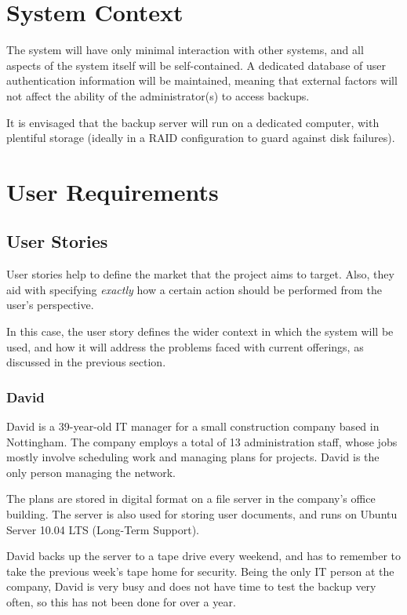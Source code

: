 \section{System Context}

The system will have only minimal interaction with other systems, and all
aspects of the system itself will be self-contained. A dedicated database of
user authentication information will be maintained, meaning that external
factors will not affect the ability of the administrator(s) to access backups.

It is envisaged that the backup server will run on a dedicated computer, with
plentiful storage (ideally in a RAID configuration to guard against disk
failures).

\section{User Requirements}

\subsection{User Stories}

User stories help to define the market that the project aims to target. Also,
they aid with specifying \emph{exactly} how a certain action should be
performed from the user's perspective.

In this case, the user story defines the wider context in which the system will
be used, and how it will address the problems faced with current offerings, as
discussed in the previous section.

\subsubsection{David}

David is a 39-year-old IT manager for a small construction company based in
Nottingham. The company employs a total of 13 administration staff, whose jobs
mostly involve scheduling work and managing plans for projects. David is the
only person managing the network.

The plans are stored in digital format on a file server in the company's office
building. The server is also used for storing user documents, and runs on
Ubuntu Server 10.04 LTS (Long-Term Support).

David backs up the server to a tape drive every weekend, and has to remember to
take the previous week's tape home for security. Being the only IT person at
the company, David is very busy and does not have time to test the backup very
often, so this has not been done for over a year.

